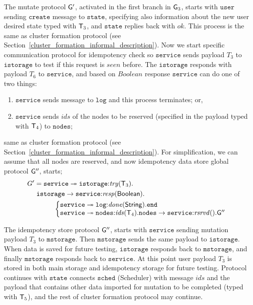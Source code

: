 The mutate protocol ${\sf G}'$, activated in the first branch in ${\sf G}_3$, starts with $\mathtt{user}$ sending 
$\mathtt{create}$ message to $\mathtt{state}$, specifying also information about the new user desired state typed with ${\mathsf T}_3$, 
and $\mathtt{state}$ replies back with $\mathit{ok}$. This process is the same as cluster formation protocol (see Section~\ref{cluster_formation_informal_description}). Now we start specific communication protocol for idempotency check so $\mathtt{service}$ sends payload $T_3$ to $\mathtt{istorage}$ to test if this request is $seen$ before. The $\mathtt{istorage}$ responds with payload $T_6$ to $\mathtt{service}$, and based on $Boolean$ response $\mathtt{service}$ can do one of two things:

\begin{enumerate}[start=1,label={(\bfseries \arabic*)}]
	\item $\mathtt{service}$ sends message to $\mathtt{log}$ and this process terminates; or,
	\item $\mathtt{service}$ sends $\mathit{ids}$ of the nodes to be reserved (specified in the payload typed with ${\mathsf T}_4$) to $\mathtt{nodes}$;
\end{enumerate}

\noindent
same as cluster formation protocol (see Section~\ref{cluster_formation_informal_description}). For simplification, we can assume that all nodes are reserved, and now idempotency data store global protocol ${\sf G}''$, starts;
\begin{align*}
G' & = 
\mathtt{service} \twoheadrightarrow \mathtt{istorage}{:}\mathit{try}(\T_3). \\
& \hspace{1mm}
\mathtt{istorage} \to \mathtt{service}{:}\mathit{resp}(\mathsf{Boolean}).\\
& \hspace{10mm}
\left\{
\begin{array}{@{}l@{}}
\mathtt{service} \twoheadrightarrow\mathtt{log}{:} \mathit{done}(\mathsf{String}).\tend\\
\mathtt{service} \twoheadrightarrow\mathtt{nodes}{:}\mathit{ids}(\T_4).
\mathtt{nodes} \to \mathtt{service}{:}\mathit{rsrvd}().\G''
\end{array} \right.
\end{align*}

\noindent
The idempotency store protocol ${\sf G}''$, starts with $\mathtt{service}$ sending mutation payload $T_3$ to $\mathtt{mstorage}$. Then $\mathtt{mstorage}$ sends the same payload to $\mathtt{istorage}$. When data is saved for future testing, $\mathtt{istorage}$ responds back to $\mathtt{mstorage}$, and finally $\mathtt{mstorage}$ responds back to $\mathtt{service}$. At this point user payload $T_3$ is stored in both main storage and idempotency storage for future testing. Protocol continues with $\mathtt{state}$ connects $\mathtt{sched}$ (Scheduler) with message $\mathit{ids}$ and the payload that contains other data imported for mutation to be completed (typed with ${\mathsf T}_5$), and the rest of cluster formation protocol may continue.

